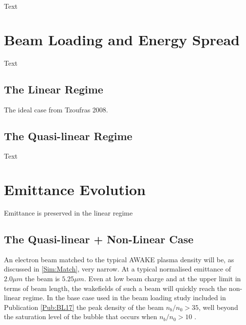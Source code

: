 Text


\section{Beam Loading and Energy Spread}
\label{Sim:BLoad}

Text


\subsection{The Linear Regime}
\label{Sim:Lin}

The ideal case from Tzoufras 2008.


\subsection{The Quasi-linear Regime}
\label{Sim:QLin}

Text


\section{Emittance Evolution}
\label{Sim:Emitt}

Emittance is preserved in the linear regime


\subsection{The Quasi-linear + Non-Linear Case}
\label{Sim:QLinNonLin}

An electron beam matched to the typical AWAKE plasma density will be, as discussed in \ref{Sim:Match}, very narrow. At a typical normalised emittance of $2.0\unit{\mu m}$ the beam is $5.25\unit{\mu m}$. Even at low beam charge and at the upper limit in terms of beam length, the wakefields of such a beam will quickly reach the non-linear regime. In the base case used in the beam loading study included in Publication \ref{Pub:BL17} \cite{berglyd_olsen:2018} the peak density of the beam $n_b/n_0 > 35$, well beyond the saturation level of the bubble that occurs when $n_b/n_0 > 10$ \cite{lu:2005}.


